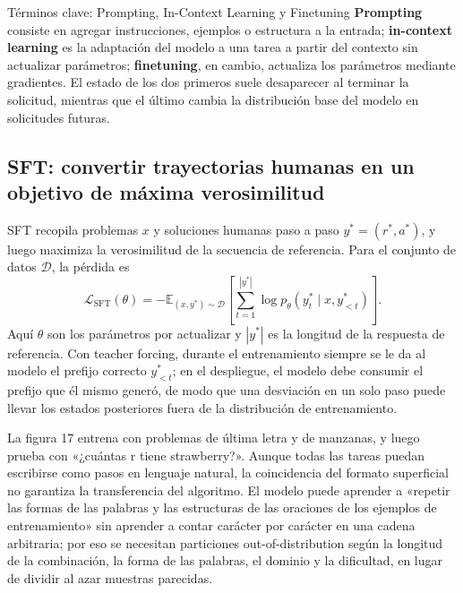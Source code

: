 
\begin{knowledgebox}{Términos clave: Prompting, In-Context Learning y Finetuning}
\textbf{Prompting} consiste en agregar instrucciones, ejemplos o estructura a la entrada; \textbf{in-context learning} es la adaptación del modelo a una tarea a partir del contexto sin actualizar parámetros; \textbf{finetuning}, en cambio, actualiza los parámetros mediante gradientes. El estado de los dos primeros suele desaparecer al terminar la solicitud, mientras que el último cambia la distribución base del modelo en solicitudes futuras.
\end{knowledgebox}

\subsection{SFT: convertir trayectorias humanas en un objetivo de máxima verosimilitud}

SFT recopila problemas $x$ y soluciones humanas paso a paso $y^*=(r^*,a^*)$, y luego maximiza la verosimilitud de la secuencia de referencia. Para el conjunto de datos $\mathcal D$, la pérdida es
\[
\mathcal L_{\text{SFT}}(\theta)
=-\mathbb E_{(x,y^*)\sim\mathcal D}
\left[\sum_{t=1}^{|y^*|}\log p_\theta(y_t^*\mid x,y_{<t}^*)\right].
\]
Aquí $\theta$ son los parámetros por actualizar y $|y^*|$ es la longitud de la respuesta de referencia. Con teacher forcing, durante el entrenamiento siempre se le da al modelo el prefijo correcto $y_{<t}^*$; en el despliegue, el modelo debe consumir el prefijo que él mismo generó, de modo que una desviación en un solo paso puede llevar los estados posteriores fuera de la distribución de entrenamiento.



La figura 17 entrena con problemas de última letra y de manzanas, y luego prueba con «¿cuántas r tiene strawberry?». Aunque todas las tareas puedan escribirse como pasos en lenguaje natural, la coincidencia del formato superficial no garantiza la transferencia del algoritmo. El modelo puede aprender a «repetir las formas de las palabras y las estructuras de las oraciones de los ejemplos de entrenamiento» sin aprender a contar carácter por carácter en una cadena arbitraria; por eso se necesitan particiones out-of-distribution según la longitud de la combinación, la forma de las palabras, el dominio y la dificultad, en lugar de dividir al azar muestras parecidas.

